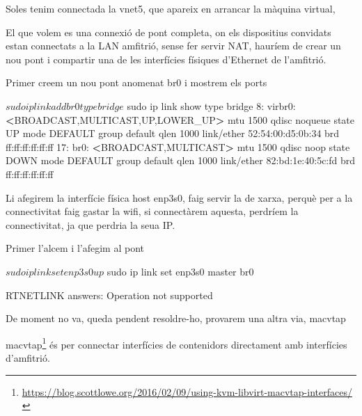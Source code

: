 \documentclass[
  10pt,
]{krantz}
\newenvironment{Shaded}{\begin{snugshade}}{\end{snugshade}}
\newcommand{\ExtensionTok}[1]{#1}
\newcommand{\NormalTok}[1]{#1}
\newcommand{\OperatorTok}[1]{\textcolor[rgb]{0.81,0.36,0.00}{\textbf{#1}}}
\DeclareRobustCommand{\href}[2]{#2\footnote{\url{#1}}}
\begin{document}
Soles tenim connectada la vnet5, que apareix en arrancar la màquina virtual,

El que volem es una connexió de pont completa, on els dispositius convidats estan connectats a la LAN amfitrió, sense fer servir NAT, hauríem de crear un nou pont i compartir una de les interfícies físiques d'Ethernet de l'amfitrió.

Primer creem un nou pont anomenat br0 i mostrem els ports

\begin{Shaded}
\begin{Highlighting}[]
\ExtensionTok{$}\NormalTok{ sudo ip link add br0 type bridge}
\ExtensionTok{$}\NormalTok{ sudo ip link show type bridge}
\ExtensionTok{8:}\NormalTok{ virbr0: }\OperatorTok{\textless{}}\NormalTok{BROADCAST,MULTICAST,UP,LOWER\_UP}\OperatorTok{\textgreater{}}\NormalTok{ mtu 1500 qdisc noqueue }
\ExtensionTok{state}\NormalTok{ UP mode DEFAULT group default qlen 1000}
    \ExtensionTok{link/ether}\NormalTok{ 52:54:00:d5:0b:34 brd ff:ff:ff:ff:ff:ff}
\ExtensionTok{17:}\NormalTok{ br0: }\OperatorTok{\textless{}}\NormalTok{BROADCAST,MULTICAST}\OperatorTok{\textgreater{}}\NormalTok{ mtu 1500 qdisc noop}
\ExtensionTok{state}\NormalTok{ DOWN mode DEFAULT group default qlen 1000}
    \ExtensionTok{link/ether}\NormalTok{ 82:bd:1e:40:5c:fd brd ff:ff:ff:ff:ff:ff}
\end{Highlighting}
\end{Shaded}

Li afegirem la interfície física host enp3s0, faig servir la de xarxa, perquè per a la connectivitat faig gastar la wifi, si connectàrem aquesta, perdríem la connectivitat, ja que perdria la seua IP.

Primer l'alcem i l'afegim al pont

\begin{Shaded}
\begin{Highlighting}[]
\ExtensionTok{$}\NormalTok{ sudo ip link set enp3s0 up}
\ExtensionTok{$}\NormalTok{ sudo ip link set enp3s0 master br0}

\ExtensionTok{RTNETLINK}\NormalTok{ answers: Operation not supported}
\end{Highlighting}
\end{Shaded}

De moment no va, queda pendent resoldre-ho, provarem una altra via, macvtap

\href{https://blog.scottlowe.org/2016/02/09/using-kvm-libvirt-macvtap-interfaces/}{macvtap} és per connectar interfícies de contenidors directament amb interfícies d'amfitrió.
\end{document}
